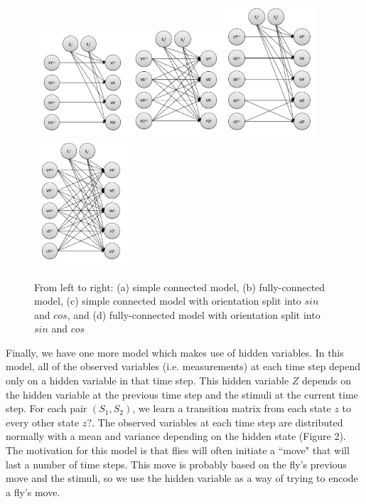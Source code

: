 \documentclass{article} %
\begin{document}
\begin{figure}[t]
\includegraphics[width=3.5cm]{simple.jpg}\includegraphics[width=3.5cm]{full.jpg}\includegraphics[width=3.5cm]{simple-sincos.jpg}\includegraphics[width=3.5cm]{full-sincos.jpg}\\
\caption{From left to right: (a) simple connected model, (b) fully-connected model, (c) simple connected model with orientation split into $sin$ and $cos$, and (d) fully-connected model with orientation split into $sin$ and $cos$} %
\end{figure}

Finally, we have one more model which makes use of hidden variables. In this model, all of the observed variables (i.e. measurements) at each time step depend only on a hidden variable in that time step. This hidden variable $Z$ depends on the hidden variable at the previous time step and the stimuli at the current time step. For each pair $(S_1,S_2)$, we learn a transition matrix from each state $z$ to every other state $z?$. The observed variables at each time step are distributed normally with a mean and variance depending on the hidden state (Figure 2). The motivation for this model is that flies will often initiate a ``move" that will last a number of time steps. This move is probably based on the fly's previous move and the stimuli, so we use the hidden variable as a way of trying to encode a fly's move.
\end{document}
